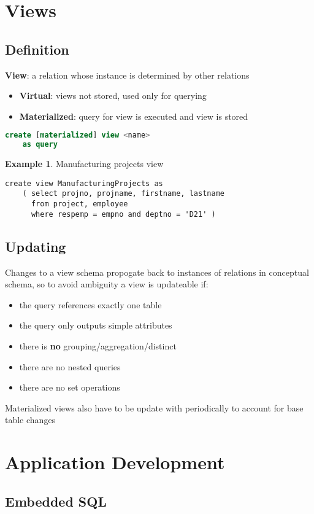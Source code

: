 \documentclass[]{article}
\theoremstyle{definition}
\newtheorem{ex}{Example}[section]
\begin{document}
	\section{Views} 
		\subsection{Definition}
			\textbf{View}: a relation whose instance is determined by other relations
			\begin{itemize}
				\item \textbf{Virtual}: views not stored, used only for querying
				\item \textbf{Materialized}: query for view is executed and view is stored
			\end{itemize}
			\begin{lstlisting}[language=SQL]
create [materialized] view <name>
	as query
			\end{lstlisting}
			\begin{ex}
				Manufacturing projects view
				\begin{lstlisting}
create view ManufacturingProjects as
	( select projno, projname, firstname, lastname
	  from project, employee
	  where respemp = empno and deptno = 'D21' )
				\end{lstlisting}
			\end{ex}
		\subsection{Updating}
			Changes to a view schema propogate back to instances of relations in conceptual schema, so to avoid ambiguity a view is updateable if:
			\begin{itemize}
				\item the query references exactly one table
				\item the query only outputs simple attributes
				\item there is \textbf{no} grouping/aggregation/distinct
				\item there are no nested queries
				\item there are no set operations
			\end{itemize}
			Materialized views also have to be update with periodically to account for base table changes
		
	\section{Application Development}
		\subsection{Embedded SQL}
\end{document}
